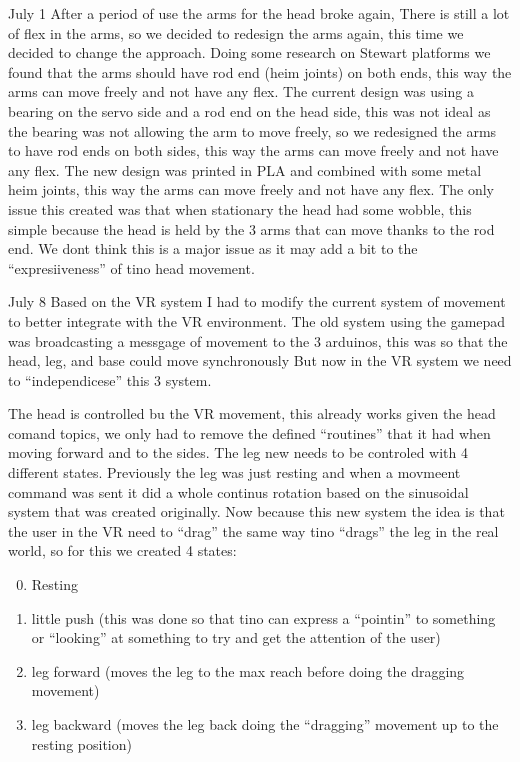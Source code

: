 July 1
After a period of use the arms for the head broke again, There is still a lot of flex in the arms, so we decided to redesign the arms again, this time we decided to change the approach. Doing some research on Stewart platforms we found that the arms should have rod end (heim joints) on both ends, this way the arms can move freely and not have any flex. The current design was using a bearing on the servo side and a rod end on the head side, this was not ideal as the bearing was not allowing the arm to move freely, so we redesigned the arms to have rod ends on both sides, this way the arms can move freely and not have any flex. The new design was printed in PLA and combined with some metal heim joints, this way the arms can move freely and not have any flex. 
The only issue this created was that when stationary the head had some wobble, this simple because the head is held by the 3 arms that can move thanks to the rod end. We dont think this is a major issue as it may add a bit to the ``expresiiveness'' of tino head movement.

July 8
Based on the VR system I had to modify the current system of movement to better integrate with the VR environment.
The old system using the gamepad was broadcasting a messgage of movement to the 3 arduinos, this was so that the head, leg, and base could move synchronously
But now in the VR system we need to ``independicese'' this 3 system.

The head is controlled bu the VR movement, this already works given the head comand topics, we only had to remove the defined ``routines'' that it had when moving forward and to the sides.
The leg new needs to be controled with 4 different states.
Previously the leg was just resting and when a movmeent command was sent it did a whole continus rotation based on the sinusoidal system that was created originally.
Now because this new system the idea is that the user in the VR need to ``drag'' the same way tino ``drags'' the leg in the real world, so for this we created 4 states:

\begin{enumerate}
\setcounter{enumi}{-1}
\item Resting
\item little push (this was done so that tino can express a ``pointin'' to something or ``looking'' at something to try and get the attention of the user)
\item leg forward (moves the leg to the max reach before doing the dragging movement)
\item leg backward (moves the leg back doing the ``dragging'' movement up to the resting position)
\end{enumerate}

